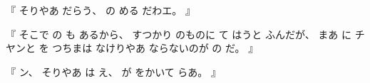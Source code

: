 %
『
そりやあ
だらう、
%
の
める
だわエ。
』

%
『
そこで
の
も
あるから、
%
すつかり
のものに
て
はうと
ふんだが、
%
まあ
に
チヤンと
を%
つちまは
なけりやあ
ならないのが
の
だ。
』

%
『
ン、
%
そりやあ
は
え、
%
が
をかいて
らあ。
』
